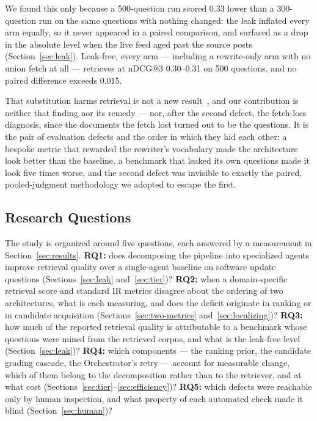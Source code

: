 \documentclass[10pt,conference]{IEEEtran}
\begin{document}
We found this only because a 500-question run scored 0.33 lower than a
300-question run on the same questions with nothing changed: the leak inflated
every arm equally, so it never appeared in a paired comparison, and surfaced as a
drop in the absolute level when the live feed aged past the source posts
(Section~\ref{sec:leak}). Leak-free, every arm --- including a rewrite-only arm
with no union fetch at all --- retrieves at nDCG@3 0.30--0.31 on 500 questions,
and no paired difference exceeds 0.015.

That substitution harms retrieval is not a new
result~\cite{wang2023query2doc,gao2024dmqr,zighelnic2008drift}, and our
contribution is neither that finding nor its remedy --- nor, after the second
defect, the fetch-loss diagnosis, since the documents the fetch lost turned out to
be the questions. It is the pair of evaluation defects and the order in which they
hid each other: a bespoke metric that rewarded the rewriter's vocabulary made the
architecture look better than the baseline, a benchmark that leaked its own
questions made it look five times worse, and the second defect was invisible to
exactly the paired, pooled-judgment methodology we adopted to escape the first.

\subsection{Research Questions}

The study is organized around five questions, each answered by a measurement in
Section~\ref{sec:results}. \textbf{RQ1:} does decomposing the pipeline into
specialized agents improve retrieval quality over a single-agent baseline on
software update questions (Sections~\ref{sec:leak} and~\ref{sec:tier})?
\textbf{RQ2:} when a domain-specific retrieval score and standard IR metrics
disagree about the ordering of two architectures, what is each measuring, and does
the deficit originate in ranking or in candidate acquisition
(Sections~\ref{sec:two-metrics} and~\ref{sec:localizing})? \textbf{RQ3:} how much
of the reported retrieval quality is attributable to a benchmark whose questions
were mined from the retrieved corpus, and what is the leak-free level
(Section~\ref{sec:leak})? \textbf{RQ4:} which components --- the ranking prior,
the candidate grading cascade, the Orchestrator's retry --- account for measurable
change, which of them belong to the decomposition rather than to the retriever, and
at what cost (Sections~\ref{sec:tier}--\ref{sec:efficiency})? \textbf{RQ5:} which
defects were reachable only by human inspection, and what property of each
automated check made it blind (Section~\ref{sec:human})?
\end{document}
